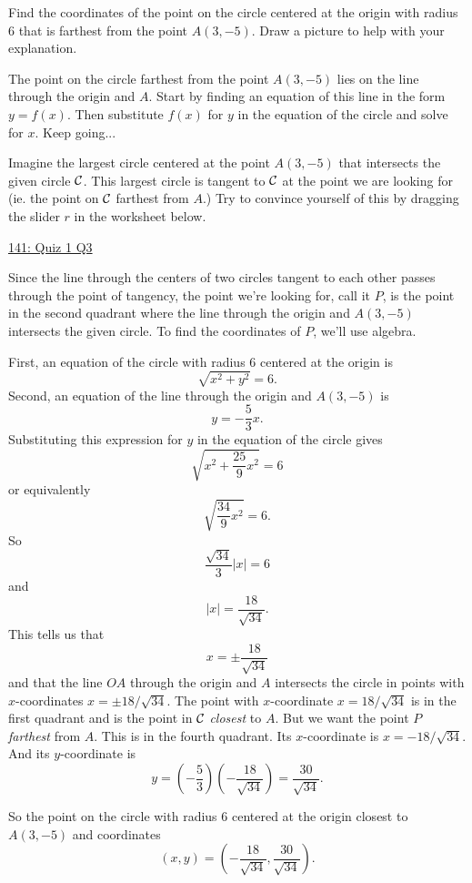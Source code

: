 \documentclass{ximera}
\begin{document}
\begin{question}  \label{Q:df454tt4443}
Find the coordinates of the point on the circle centered at the origin with radius $6$ that is farthest from the point $A(3,-5)$. Draw a picture to help with your explanation.

\begin{hint}
The point on the circle farthest from the point $A(3,-5)$ lies on the line through the origin and $A$. Start by finding an equation of this line in the form $y=f(x)$. Then substitute $f(x)$ for $y$ in the equation of the circle and solve for $x$. Keep going...
\end{hint}

\begin{explanation}

Imagine the largest circle centered at the point $A(3,-5)$ that intersects the given circle ${\cal C}$. This largest circle is tangent to ${\cal C}$ at the point we are looking for (ie. the point on ${\cal C}$ farthest from $A$.) Try to convince yourself of this by dragging the slider $r$ in the worksheet below.  
\begin{onlineOnly}
    \begin{center}
\end{center}
\end{onlineOnly}

\href{https://www.desmos.com/calculator/wwqosobejf}{141: Quiz 1 Q3}

Since the line through the centers of two circles tangent to each other passes through the point of tangency, the point we're looking for, call it $P$, is the point in the second quadrant where the line through the origin and $A(3,-5)$ intersects the given circle. To find the coordinates of $P$, we'll use algebra.

First, an equation of the circle with radius $6$ centered at the origin is
\[
     \sqrt{x^2 + y^2} = 6.
\] 
Second, an equation of the line through the origin and $A(3,-5)$ is
\[
     y = -\frac{5}{3}x .
\]
Substituting this expression for $y$ in the equation of the circle gives
\[
  \sqrt{x^2 + \frac{25}{9}x^2} = 6 
\]
or equivalently
\[
      \sqrt{\frac{34}{9}x^2} = 6 .
\]
So
\[
       \frac{\sqrt{34}}{3}|x| = 6
\]
and
\[
     | x | = \frac{18}{\sqrt{34}} .
\]
This tells us that 
\[
     x = \pm \frac{18}{\sqrt{34}} 
\]
and that the line $OA$ through the origin and $A$ intersects the circle in points with $x$-coordinates $x=\pm 18/\sqrt{34}$.  The point with $x$-coordinate $x=18/\sqrt{34}$ is in the first quadrant and is the point in ${\cal C}$ \emph{closest} to $A$. But we want the point $P$ \emph{farthest} from $A$. This is in the fourth quadrant. Its $x$-coordinate is $x = -18/\sqrt{34}$. And its $y$-coordinate is
\[
    y = \left( -\frac{5}{3} \right) \left(-  \frac{18}{\sqrt{34}}  \right) = \frac{30}{\sqrt{34}}.
\]

So the point on the circle with radius $6$ centered at the origin closest to $A(3,-5)$ and coordinates
\[
   (x,y) = \left(  - \frac{18}{\sqrt{34}} ,  \frac{30}{\sqrt{34}}         \right).
\]

\end{explanation}

\end{question}
\end{document}
